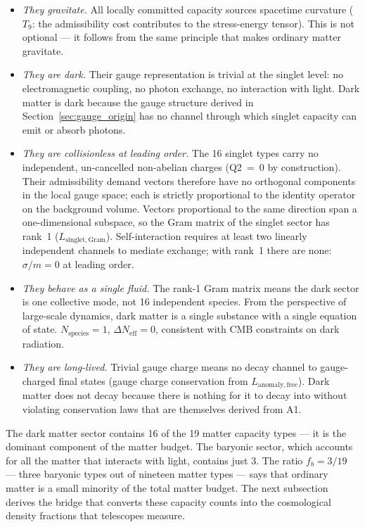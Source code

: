 \documentclass[11pt]{article}
\newenvironment{varlist}{\begin{itemize}[nosep,leftmargin=2em]}{\end{itemize}}
\begin{document}
\begin{varlist}
\item \textit{They gravitate.}  All locally committed capacity sources spacetime curvature ($T_9$: the admissibility cost contributes to the stress-energy tensor).  This is not optional --- it follows from the same principle that makes ordinary matter gravitate.
\item \textit{They are dark.}  Their gauge representation is trivial at the singlet level: no electromagnetic coupling, no photon exchange, no interaction with light.  Dark matter is dark because the gauge structure derived in Section~\ref{sec:gauge_origin} has no channel through which singlet capacity can emit or absorb photons.
\item \textit{They are collisionless at leading order.}  The 16 singlet types carry no independent, un-cancelled non-abelian charges (Q2~=~0 by construction).  Their admissibility demand vectors therefore have no orthogonal components in the local gauge space; each is strictly proportional to the identity operator on the background volume.  Vectors proportional to the same direction span a one-dimensional subspace, so the Gram matrix of the singlet sector has rank~1 ($L_{\mathrm{singlet,Gram}}$).  Self-interaction requires at least two linearly independent channels to mediate exchange; with rank~1 there are none: $\sigma/m = 0$ at leading order.
\item \textit{They behave as a single fluid.}  The rank-1 Gram matrix means the dark sector is one collective mode, not 16 independent species.  From the perspective of large-scale dynamics, dark matter is a single substance with a single equation of state.  $N_{\mathrm{species}} = 1$, $\Delta N_{\mathrm{eff}} = 0$, consistent with CMB constraints on dark radiation.
\item \textit{They are long-lived.}  Trivial gauge charge means no decay channel to gauge-charged final states (gauge charge conservation from $L_{\mathrm{anomaly,free}}$).  Dark matter does not decay because there is nothing for it to decay into without violating conservation laws that are themselves derived from A1.
\end{varlist}

The dark matter sector contains 16 of the 19 matter capacity types --- it is the dominant component of the matter budget.  The baryonic sector, which accounts for all the matter that interacts with light, contains just 3.  The ratio $f_b = 3/19$ --- three baryonic types out of nineteen matter types --- says that ordinary matter is a small minority of the total matter budget.  The next subsection derives the bridge that converts these capacity counts into the cosmological density fractions that telescopes measure.
\end{document}
